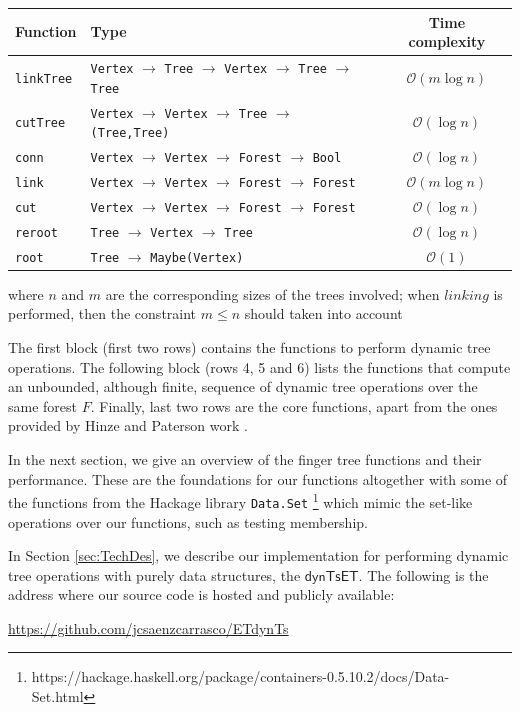 \documentclass{elsarticle}
\newcommand{\tcb} [1]{\emph{\textcolor{blue}{#1}}}
\newcommand{\MATHSF}[1]{\ensuremath{\mathsf{#1}}\xspace}
\newcommand{\dyntset}{\MATHSF{dynTsET}}
\renewcommand{\O}{\ensuremath{\mathcal{O}}}
\begin{document}
\begin{center}
\small
 \begin{tabular}{||l | l | c||} 
 \hline
 Function & Type & Time complexity \\ %
 \hline\hline
 \texttt{linkTree} & \texttt{Vertex} $\to$ \texttt{Tree} $\to$ \texttt{Vertex} $\to$ \texttt{Tree} $\to$ \texttt{Tree} & $\O(m\log n)$ \\
 \texttt{cutTree} & \texttt{Vertex} $\to$ \texttt{Vertex} $\to$ \texttt{Tree} $\to$ \texttt{(Tree,Tree)} & $\O(\log n)$ \\
 \hline
 \texttt{conn} & \texttt{Vertex} $\to$ \texttt{Vertex} $\to$ \texttt{Forest} $\to$ \texttt{Bool} & $\O(\log n)$ \\ 
 \texttt{link} & \texttt{Vertex} $\to$ \texttt{Vertex} $\to$ \texttt{Forest} $\to$ \texttt{Forest} & $\O(m\log n)$ \\
 \texttt{cut} & \texttt{Vertex} $\to$ \texttt{Vertex} $\to$ \texttt{Forest} $\to$ \texttt{Forest} & $\O(\log n)$ \\
 \hline
 \texttt{reroot} & \texttt{Tree} $\to$ \texttt{Vertex} $\to$ \texttt{Tree} & $\O(\log n)$ \\
 \texttt{root} & \texttt{Tree} $\to$ \texttt{Maybe(Vertex)} & $\O(1)$ \\
 \hline   
\end{tabular}
where $n$ and $m$ are the corresponding sizes of the trees involved; when $linking$ is performed, then the constraint $m \leq n$ should taken into account
\end{center}
\normalsize 

The first block (first two rows) contains the functions to perform dynamic tree operations. The following block (rows 4, 5 and 6) lists the functions that compute an unbounded, although finite, sequence of dynamic tree operations over the same forest $F$. Finally, last two rows are the core functions, apart from the ones provided by Hinze and Paterson work \cite{FTs}. 

In the next section, we give an overview of the finger tree functions and their performance. These are the foundations for our functions altogether with some of the functions from the Hackage library \texttt{Data.Set} \footnote{https://hackage.haskell.org/package/containers-0.5.10.2/docs/Data-Set.html} which mimic the set-like operations over our functions, such as testing membership. 

In Section \ref{sec:TechDes}, we describe our implementation for performing dynamic tree operations with purely data structures, the \dyntset. The following is the address where our source code is hosted and publicly available:
\begin{center}
\url{https://github.com/jcsaenzcarrasco/ETdynTs}
\end{center}
\end{document}
